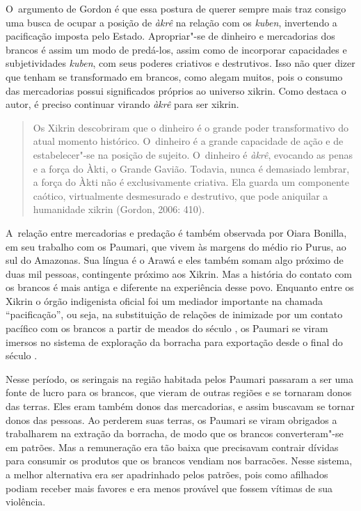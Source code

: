 O~argumento de Gordon é que essa postura de querer sempre mais traz
consigo uma busca de ocupar a posição de \emph{àkrê} na relação com os \emph{kuben},
invertendo a pacificação imposta pelo Estado. Apropriar"-se de dinheiro
e mercadorias dos brancos é assim um modo de predá-los, assim como de
incorporar capacidades e subjetividades \emph{kuben}, com seus poderes
criativos e destrutivos. Isso não quer dizer que tenham se transformado
em brancos, como alegam muitos, pois o consumo das mercadorias possui
significados próprios ao universo xikrin. Como destaca o autor, é
preciso continuar virando \emph{àkrê} para ser xikrin.

\begin{quote}
Os Xikrin descobriram que o dinheiro é o grande poder transformativo do
atual momento histórico. O~dinheiro é a grande capacidade de ação e de
estabelecer"-se na posição de sujeito. O~dinheiro é \emph{àkrê}, evocando as
penas e a força do Àkti, o Grande Gavião. Todavia, nunca é demasiado
lembrar, a força do Àkti não é exclusivamente criativa. Ela guarda um
componente caótico, virtualmente desmesurado e destrutivo, que pode
aniquilar a humanidade xikrin (Gordon, 2006: 410).
\end{quote}

A~relação entre mercadorias e predação é também observada por Oiara
Bonilla, em seu trabalho com os Paumari, que vivem às margens do médio
rio Purus, ao sul do Amazonas. Sua língua é o Arawá e eles também somam
algo próximo de duas mil pessoas, contingente próximo aos Xikrin. Mas a
história do contato com os brancos é mais antiga e diferente na
experiência desse povo. Enquanto entre os Xikrin o órgão indigenista
oficial foi um mediador importante na chamada ``pacificação'', ou seja,
na substituição de relações de inimizade por um contato pacífico com os
brancos a partir de meados do século , os Paumari se viram imersos no
sistema de exploração da borracha para exportação desde o final do
século .

Nesse período, os seringais na região habitada pelos Paumari passaram a
ser uma fonte de lucro para os brancos, que vieram de outras regiões e
se tornaram donos das terras. Eles eram também donos das mercadorias, e
assim buscavam se tornar donos das pessoas. Ao perderem suas terras, os
Paumari se viram obrigados a trabalharem na extração da borracha, de
modo que os brancos converteram"-se em patrões. Mas a remuneração era
tão baixa que precisavam contrair dívidas para consumir os produtos que
os brancos vendiam nos barracões. Nesse sistema, a melhor alternativa
era ser apadrinhado pelos patrões, pois como afilhados podiam receber
mais favores e era menos provável que fossem vítimas de sua violência.

